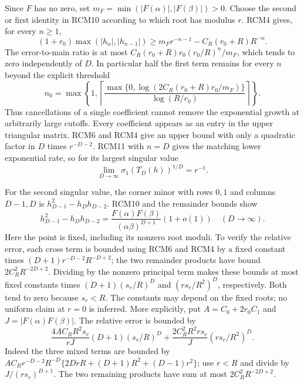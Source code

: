 Since $F$ has no zero, set $m_F=\min(|F(\alpha)|,|F(\beta)|)>0$.
Choose the second or first identity in RCM10 according to which
root has modulus $r$.  RCM4 gives, for every $n\ge1$,
\[
 (1+r_0)\max(|h_n|,|h_{n-1}|)
 \ge m_Fr^{-n-1}-C_R(r_0+R)R^{-n}.
 \tag{RCM11}
\]
The error-to-main ratio is at most
$C_R(r_0+R)r_0(r_0/R)^n/m_F$, which tends to zero independently
of $D$.  In particular half the first term remains for every
$n$ beyond the explicit threshold
\[
 n_0=\max\left\{1,
 \left\lceil
  \frac{\max\{0,\log(2C_R(r_0+R)r_0/m_F)\}}
       {\log(R/r_0)}
 \right\rceil\right\}.
 \tag{RCM12}
\]
Thus cancellations of a single coefficient cannot remove the
exponential growth at arbitrarily large cutoffs.  Every coefficient
appears as an entry in the upper triangular matrix.  RCM6 and
RCM4 give an upper bound with only a quadratic factor in $D$
times $r^{-D-2}$.  RCM11 with $n=D$ gives the matching lower
exponential rate, so for its largest singular value
\[
 \lim_{D\to\infty}\sigma_1(T_D(h))^{1/D}=r^{-1}.
 \tag{RCM13}
\]

For the second singular value, the corner minor with rows $0,1$
and columns $D-1,D$ is $h_{D-1}^2-h_Dh_{D-2}$.
RCM10 and the remainder bounds show
\[
 h_{D-1}^2-h_Dh_{D-2}
 =\frac{F(\alpha)F(\beta)}{(\alpha\beta)^{D+1}}(1+o(1))
 \quad(D\to\infty).
 \tag{RCM14}
\]
Here the point is fixed, including its nonzero root moduli.
To verify the relative error, each cross term is bounded using
RCM6 and RCM4 by a fixed constant times
$(D+1)r^{-D-2}R^{-D+2}$; the two remainder products have
bound $2C_R^2R^{-2D+2}$.  Dividing by the nonzero principal
term makes these bounds at most fixed constants times
$(D+1)(s_r/R)^D$ and $(r s_r/R^2)^D$, respectively.
Both tend to zero because $s_r<R$.  The constants may depend
on the fixed roots; no uniform claim at $r=0$ is inferred.
More explicitly, put $A=C_0+2r_0C_1$ and
$J=|F(\alpha)F(\beta)|$. The relative error is bounded by
\[
 \frac{4AC_RR^2s_r}{rJ}(D+1)(s_r/R)^D
 +\frac{2C_R^2R^2rs_r}{J}(rs_r/R^2)^D.
\]
Indeed the three mixed terms are bounded by
$AC_Rr^{-D-2}R^{-D}\{2DrR+(D+1)R^2+(D-1)r^2\}$;
use $r<R$ and divide by $J/(rs_r)^{D+1}$.
The two remaining products have sum at most $2C_R^2R^{-2D+2}$.

